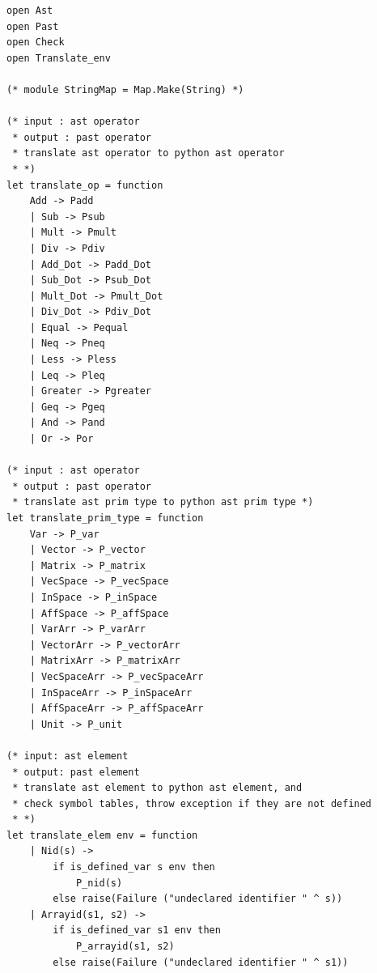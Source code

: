 \documentclass[12pt]{article} %
\begin{document}
\begin{lstlisting}[style=appendix, caption=translate.ml]
open Ast
open Past
open Check
open Translate_env

(* module StringMap = Map.Make(String) *)

(* input : ast operator
 * output : past operator
 * translate ast operator to python ast operator 
 * *)
let translate_op = function
    Add -> Padd
    | Sub -> Psub
    | Mult -> Pmult
    | Div -> Pdiv
    | Add_Dot -> Padd_Dot
    | Sub_Dot -> Psub_Dot
    | Mult_Dot -> Pmult_Dot
    | Div_Dot -> Pdiv_Dot
    | Equal -> Pequal
    | Neq -> Pneq
    | Less -> Pless
    | Leq -> Pleq
    | Greater -> Pgreater
    | Geq -> Pgeq
    | And -> Pand
    | Or -> Por

(* input : ast operator
 * output : past operator
 * translate ast prim type to python ast prim type *)
let translate_prim_type = function
    Var -> P_var
    | Vector -> P_vector
    | Matrix -> P_matrix
    | VecSpace -> P_vecSpace
    | InSpace -> P_inSpace
    | AffSpace -> P_affSpace
    | VarArr -> P_varArr
    | VectorArr -> P_vectorArr
    | MatrixArr -> P_matrixArr
    | VecSpaceArr -> P_vecSpaceArr
    | InSpaceArr -> P_inSpaceArr
    | AffSpaceArr -> P_affSpaceArr
    | Unit -> P_unit

(* input: ast element
 * output: past element
 * translate ast element to python ast element, and
 * check symbol tables, throw exception if they are not defined
 * *)
let translate_elem env = function
    | Nid(s) -> 
        if is_defined_var s env then
            P_nid(s)
        else raise(Failure ("undeclared identifier " ^ s))
    | Arrayid(s1, s2) -> 
        if is_defined_var s1 env then
            P_arrayid(s1, s2)
        else raise(Failure ("undeclared identifier " ^ s1))


\end{lstlisting}
\end{document}
